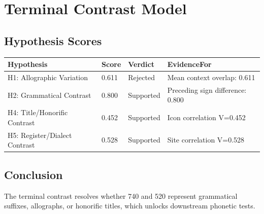 \section{Terminal Contrast Model}

\subsection{Hypothesis Scores}
\begin{tabular}{llll}
\toprule
\textbf{Hypothesis} & \textbf{Score} & \textbf{Verdict} & \textbf{EvidenceFor} \\
\midrule
H1: Allographic Variation & 0.611 & Rejected & Mean context overlap: 0.611 \\
H2: Grammatical Contrast & 0.800 & Supported & Preceding sign difference: 0.800 \\
H4: Title/Honorific Contrast & 0.452 & Supported & Icon correlation V=0.452 \\
H5: Register/Dialect Contrast & 0.528 & Supported & Site correlation V=0.528 \\
\bottomrule
\end{tabular}

\subsection{Conclusion}
The terminal contrast resolves whether 740 and 520 represent grammatical suffixes, allographs, or honorific titles, which unlocks downstream phonetic tests.

